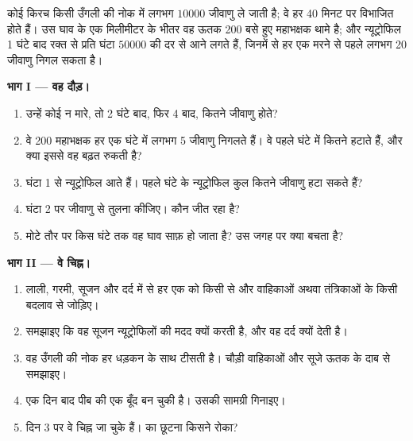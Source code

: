 \begin{problem}
\label{pb:g12:innate-immunity:1}
कोई किरच किसी उँगली की नोक में लगभग $\num{10000}$ जीवाणु ले जाती है; वे हर
40 मिनट पर विभाजित होते हैं। उस घाव के एक मिलीमीटर के भीतर वह ऊतक 200 बसे
हुए महाभक्षक थामे है; और न्यूट्रोफिल 1 घंटे बाद रक्त से प्रति घंटा
$\num{50000}$ की दर से आने लगते हैं, जिनमें से हर एक मरने से पहले लगभग 20
जीवाणु निगल सकता है।

\medskip
\noindent\textbf{भाग I --- वह दौड़।}
\begin{enumerate}
  \item उन्हें कोई न मारे, तो 2 घंटे बाद, फिर 4 बाद, कितने जीवाणु होते?
  \item वे 200 महाभक्षक हर एक घंटे में लगभग 5 जीवाणु निगलते हैं। वे पहले
        घंटे में कितने हटाते हैं, और क्या इससे वह बढ़त रुकती है?
  \item घंटा 1 से न्यूट्रोफिल आते हैं। पहले घंटे के न्यूट्रोफिल कुल कितने
        जीवाणु हटा सकते हैं?
  \item घंटा 2 पर जीवाणु  से तुलना कीजिए। कौन जीत रहा है?
  \item मोटे तौर पर किस घंटे तक वह घाव साफ़ हो जाता है? उस जगह पर क्या बचता
        है?
\end{enumerate}

\medskip
\noindent\textbf{भाग II --- वे चिह्न।}
\begin{enumerate}[resume]
  \item लाली, गरमी, सूजन और दर्द में से हर एक को किसी  से और
        वाहिकाओं अथवा तंत्रिकाओं के किसी बदलाव से जोड़िए।
  \item समझाइए कि वह सूजन न्यूट्रोफिलों की मदद क्यों करती है, और वह दर्द
        क्यों देती है।
  \item वह उँगली की नोक हर धड़कन के साथ टीसती है। चौड़ी वाहिकाओं और सूजे ऊतक
        के दाब से समझाइए।
  \item एक दिन बाद पीब की एक बूँद बन चुकी है। उसकी सामग्री गिनाइए।
  \item दिन 3 पर वे चिह्न जा चुके हैं।  का छूटना किसने रोका?
\end{enumerate}


\end{problem}
